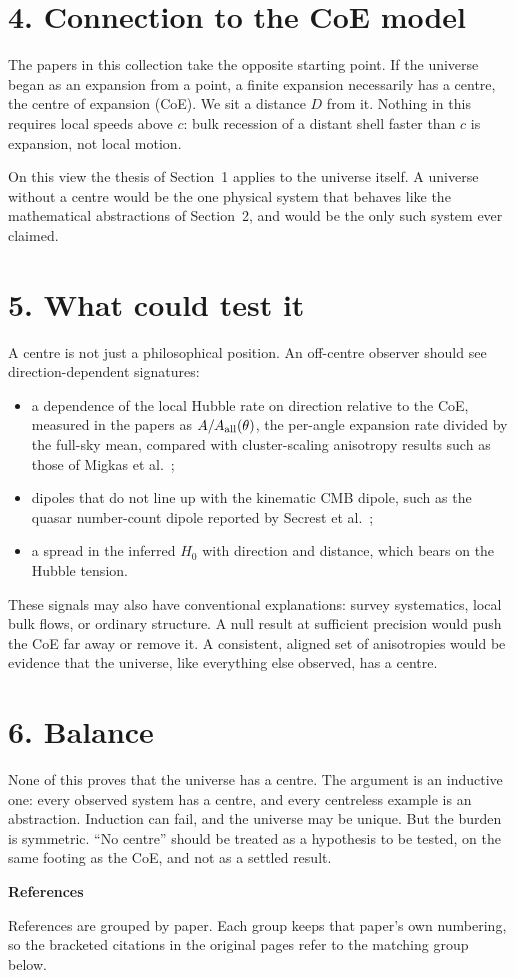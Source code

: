 \documentclass[11pt,a4paper]{article}
\begin{document}
\section*{4. Connection to the CoE model}
The papers in this collection take the opposite starting point. If the universe began as an expansion from a point, a finite expansion necessarily has a centre, the centre of expansion (CoE). We sit a distance $D$ from it. Nothing in this requires local speeds above $c$: bulk recession of a distant shell faster than $c$ is expansion, not local motion.

On this view the thesis of Section~1 applies to the universe itself. A universe without a centre would be the one physical system that behaves like the mathematical abstractions of Section~2, and would be the only such system ever claimed.
\section*{5. What could test it}
A centre is not just a philosophical position. An off-centre observer should see direction-dependent signatures:
\begin{itemize}
\item a dependence of the local Hubble rate on direction relative to the CoE, measured in the papers as $A/A_{\rm all}(\theta)$, the per-angle expansion rate divided by the full-sky mean, compared with cluster-scaling anisotropy results such as those of Migkas et al.~\cite{migkas};
\item dipoles that do not line up with the kinematic CMB dipole, such as the quasar number-count dipole reported by Secrest et al.~\cite{secrest};
\item a spread in the inferred $H_0$ with direction and distance, which bears on the Hubble tension.
\end{itemize}
These signals may also have conventional explanations: survey systematics, local bulk flows, or ordinary structure. A null result at sufficient precision would push the CoE far away or remove it. A consistent, aligned set of anisotropies would be evidence that the universe, like everything else observed, has a centre.
\section*{6. Balance}
None of this proves that the universe has a centre. The argument is an inductive one: every observed system has a centre, and every centreless example is an abstraction. Induction can fail, and the universe may be unique. But the burden is symmetric. ``No centre'' should be treated as a hypothesis to be tested, on the same footing as the CoE, and not as a settled result.
\clearpage
{}
\begin{center}{\Large\bfseries References\par}\end{center}
\noindent\small References are grouped by paper. Each group keeps that paper's own numbering, so the bracketed citations in the original pages refer to the matching group below.
\end{document}
